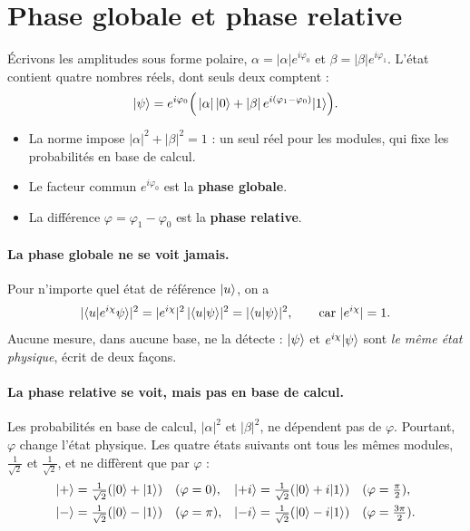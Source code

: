 \section{Phase globale et phase relative}\label{sec:phases}
Écrivons les amplitudes sous forme polaire, $\alpha=|\alpha|e^{i\varphi_0}$ et $\beta=|\beta|e^{i\varphi_1}$. L'état contient quatre nombres réels, dont seuls deux comptent :
\[
\lvert \psi\rangle=e^{i\varphi_0}\Big(\,|\alpha|\,\lvert 0\rangle+|\beta|\,e^{i(\varphi_1-\varphi_0)}\lvert 1\rangle\Big).
\]
\begin{itemize}
\item La norme impose $|\alpha|^2+|\beta|^2=1$ : un seul réel pour les modules, qui fixe les probabilités en base de calcul.
\item Le facteur commun $e^{i\varphi_0}$ est la \textbf{phase globale}.
\item La différence $\varphi=\varphi_1-\varphi_0$ est la \textbf{phase relative}.
\end{itemize}

\paragraph{La phase globale ne se voit jamais.} Pour n'importe quel état de référence $\lvert u\rangle$, on a
\[|\langle u\vert e^{i\chi}\psi\rangle|^2=|e^{i\chi}|^2\,|\langle u\vert \psi\rangle|^2=|\langle u\vert \psi\rangle|^2,\qquad\text{car } |e^{i\chi}|=1.\] Aucune mesure, dans aucune base, ne la détecte : $\lvert \psi\rangle$ et $e^{i\chi}\lvert \psi\rangle$ sont \emph{le même état physique}, écrit de deux façons.

\paragraph{La phase relative se voit, mais pas en base de calcul.} Les probabilités en base de calcul, $|\alpha|^2$ et $|\beta|^2$, ne dépendent pas de $\varphi$. Pourtant, $\varphi$ change l'état physique. Les quatre états suivants ont tous les mêmes modules, $\tfrac1{\sqrt2}$ et $\tfrac1{\sqrt2}$, et ne diffèrent que par $\varphi$ :
\begin{align*}
\lvert +\rangle&=\tfrac{1}{\sqrt2}(\lvert 0\rangle+\lvert 1\rangle)\quad (\varphi=0), &
\lvert +i\rangle&=\tfrac{1}{\sqrt2}(\lvert 0\rangle+i\lvert 1\rangle)\quad (\varphi=\tfrac\pi2),\\
\lvert -\rangle&=\tfrac{1}{\sqrt2}(\lvert 0\rangle-\lvert 1\rangle)\quad (\varphi=\pi), &
\lvert -i\rangle&=\tfrac{1}{\sqrt2}(\lvert 0\rangle-i\lvert 1\rangle)\quad (\varphi=\tfrac{3\pi}2).
\end{align*}

